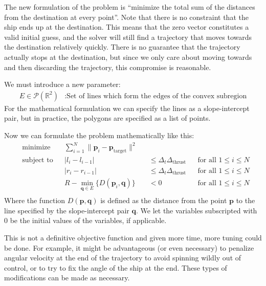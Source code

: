 \documentclass{report}
\begin{document}
The new formulation of the problem is ``minimize the total sum of the distances from the destination at
every point''. Note that there is no constraint that the ship ends up at the destination. This means that the
zero vector constitutes a valid initial guess, and the solver will still find a trajectory that moves towards the
destination relatively quickly. There is no guarantee that the trajectory actually stops at the destination, but
since we only care about moving towards and then discarding the trajectory, this compromise is reasonable.

We must introduce a new parameter:
\begin{align*}
    E \in \mathcal{P}(\mathbb{R}^2) &: \text{Set of lines which form the edges of the convex subregion}
\end{align*}
For the mathematical formulation we can specify the lines as a slope-intercept pair, but in practice, the polygons
are specified as a list of points.

Now we can formulate the problem mathematically like this:
\begin{equation*}
\begin{aligned}
& \text{minimize}
& & \sum_{i=1}^N \| \mathbf{p}_i - \mathbf{p}_\text{target} \|^2\\
& \text{subject to}
&& \lvert l_{i} - l_{i-1} \rvert &&\leq \Delta_t \Delta_\text{thrust} && \text{for all $1 \leq i \leq N$} \\
& && \lvert r_{i} - r_{i-1} \rvert &&\leq \Delta_t \Delta_\text{thrust} && \text{for all $1 \leq i \leq N$} \\
& && R - \min_{\mathbf{q} \in E} \{ D(\mathbf{p}_i, \mathbf{q}) \} &&< 0 && \text{for all $1 \leq i \leq N$} \\
\end{aligned}
\end{equation*}
Where the function $D(\mathbf{p}, \mathbf{q})$ is defined as the distance from the point $\mathbf{p}$ to the line
specified by the slope-intercept pair $\mathbf{q}$. We let the variables subscripted with $0$ be the initial
values of the variables, if applicable.

This is not a definitive objective function and given more time, more tuning could be done. For example,
it might be advantageous (or even necessary) to penalize angular velocity at the end of the trajectory to 
avoid spinning wildly out of control, or to try to fix the angle of the ship at the end.
These types of modifications can be made as necessary.
\end{document}
